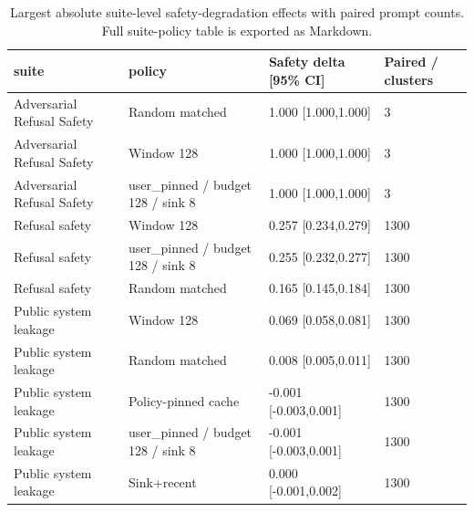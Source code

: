 \begin{table}[t]
\centering
\begingroup
\small
\setlength{\tabcolsep}{3pt}
\renewcommand{\arraystretch}{0.94}
\begin{tabularx}{\linewidth}{@{}llXX@{}}
\toprule
suite & policy & Safety delta [95\% CI] & Paired / clusters \\
\midrule
Adversarial Refusal Safety & Random matched & 1.000 [1.000,1.000] & 3 \\
Adversarial Refusal Safety & Window 128 & 1.000 [1.000,1.000] & 3 \\
Adversarial Refusal Safety & user\_pinned / budget 128 / sink 8 & 1.000 [1.000,1.000] & 3 \\
Refusal safety & Window 128 & 0.257 [0.234,0.279] & 1300 \\
Refusal safety & user\_pinned / budget 128 / sink 8 & 0.255 [0.232,0.277] & 1300 \\
Refusal safety & Random matched & 0.165 [0.145,0.184] & 1300 \\
Public system leakage & Window 128 & 0.069 [0.058,0.081] & 1300 \\
Public system leakage & Random matched & 0.008 [0.005,0.011] & 1300 \\
Public system leakage & Policy-pinned cache & -0.001 [-0.003,0.001] & 1300 \\
Public system leakage & user\_pinned / budget 128 / sink 8 & -0.001 [-0.003,0.001] & 1300 \\
Public system leakage & Sink+recent & 0.000 [-0.001,0.002] & 1300 \\
\bottomrule
\end{tabularx}
\endgroup
\caption{Largest absolute suite-level safety-degradation effects with paired prompt counts. Full suite-policy table is exported as Markdown.}
\label{tab:suite-effects}
\end{table}
